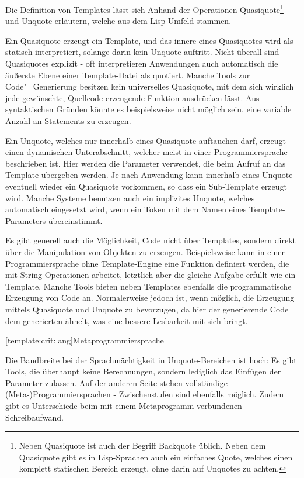 \documentclass[11pt, a4paper, bibgerm]{scrbook}
\newcommand\lsubsection{}
\newcommand{\cgen}{Code"=Generierung}
\begin{document}
Die Definition von Templates lässt sich Anhand der Operationen
Quasiquote\footnote{Neben Quasiquote ist auch der Begriff Backquote
  üblich. Neben dem Quasiquote gibt es in Lisp-Sprachen auch ein
  einfaches Quote, welches einen komplett statischen Bereich erzeugt,
  ohne darin auf Unquotes zu achten.} und Unquote erläutern, welche aus
dem Lisp-Umfeld stammen.

Ein Quasiquote erzeugt ein Template, und das innere eines Quasiquotes
wird als statisch interpretiert, solange darin kein Unquote
auftritt. Nicht überall sind Quasiquotes explizit - oft interpretieren
Anwendungen auch automatisch die äußerste Ebene einer Template-Datei als
quotiert. Manche Tools zur \cgen{} besitzen kein universelles
Quasiquote, mit dem sich wirklich jede gewünschte, Quellcode erzeugende
Funktion ausdrücken lässt. Aus syntaktischen Gründen könnte es
beispielsweise nicht möglich sein, eine variable Anzahl an Statements zu
erzeugen.

Ein Unquote, welches nur innerhalb eines Quasiquote auftauchen darf,
erzeugt einen dynamischen Unterabschnitt, welcher meist in einer
Programmiersprache beschrieben ist. Hier werden die Parameter verwendet,
die beim Aufruf an das Template übergeben werden. Je nach Anwendung kann
innerhalb eines Unquote eventuell wieder ein Quasiquote vorkommen, so
dass ein Sub-Template erzeugt wird. Manche Systeme benutzen auch ein
implizites Unquote, welches automatisch eingesetzt wird, wenn ein Token
mit dem Namen eines Template-Parameters übereinstimmt.

Es gibt generell auch die Möglichkeit, Code nicht über Templates,
sondern direkt über die Manipulation von Objekten zu
erzeugen. Beispielsweise kann in einer Programmiersprache ohne
Template-Engine eine Funktion definiert werden, die mit String-Operationen
arbeitet, letztlich aber die gleiche Aufgabe erfüllt wie ein
Template. Manche Tools bieten neben Templates ebenfalls die
programmatische Erzeugung von Code an. Normalerweise jedoch ist, wenn
möglich, die Erzeugung mittels Quasiquote und Unquote zu bevorzugen, da hier
der generierende Code dem generierten ähnelt, was eine bessere
Lesbarkeit mit sich bringt.

\lsubsection[template:crit:lang]{Metaprogrammiersprache}

Die Bandbreite bei der Sprachmächtigkeit in Unquote-Bereichen ist hoch:
Es gibt Tools, die überhaupt keine Berechnungen, sondern lediglich das
Einfügen der Parameter zulassen. Auf der anderen Seite stehen
vollständige (Meta-)Programmiersprachen - Zwischenstufen sind ebenfalls
möglich. Zudem gibt es Unterschiede beim mit einem Metaprogramm
verbundenen Schreibaufwand.
\end{document}

